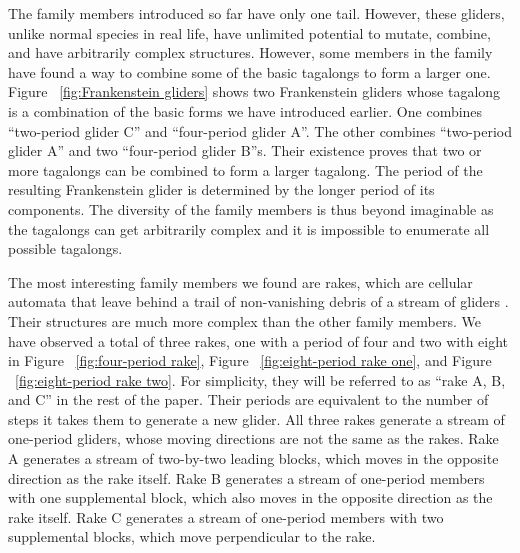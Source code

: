 \documentclass[12pt]{article}
\numberwithin{figure}{section} %
\begin{document}
The family members introduced so far have only one tail. However, these gliders, unlike normal species in real life, have unlimited potential to mutate, combine, and have arbitrarily complex structures. However, some members in the family have found a way to combine some of the basic tagalongs to form a larger one. Figure ~\ref{fig:Frankenstein gliders} shows two Frankenstein gliders whose tagalong is a combination of the basic forms we have introduced earlier. One combines “two-period glider C” and “four-period glider A”. The other combines “two-period glider A” and two “four-period glider B”s. Their existence proves that two or more tagalongs can be combined to form a larger tagalong. The period of the resulting Frankenstein glider is determined by the longer period of its components. The diversity of the family members is thus beyond imaginable as the tagalongs can get arbitrarily complex and it is impossible to enumerate all possible tagalongs. 

The most interesting family members we found are rakes, which are cellular automata that leave behind a trail of non-vanishing debris of a stream of gliders \cite{rake}. Their structures are much more complex than the other family members. We have observed a total of three rakes, one with a period of four and two with eight in Figure ~\ref{fig:four-period rake}, Figure ~\ref{fig:eight-period rake one}, and Figure ~\ref{fig:eight-period rake two}. For simplicity, they will be referred to as “rake A, B, and C” in the rest of the paper. Their periods are equivalent to the number of steps it takes them to generate a new glider. All three rakes generate a stream of one-period gliders, whose moving directions are not the same as the rakes. Rake A generates a stream of two-by-two leading blocks, which moves in the opposite direction as the rake itself. Rake B generates a stream of one-period members with one supplemental block, which also moves in the opposite direction as the rake itself. Rake C generates a stream of one-period members with two supplemental blocks, which move perpendicular to the rake. 
\end{document}
